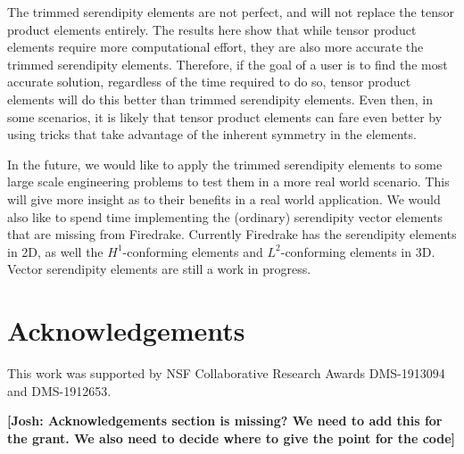 \documentclass[format=acmsmall,screen,timestamp=false,a4paper]{acmart}
\newcommand\josh[1]{\textbf{\textcolor[rgb]{0,.5,1}{[Josh: #1]}}}
\begin{document}
The trimmed serendipity elements are not perfect, and will not replace the tensor product elements entirely.  The results here show that while tensor product elements require more computational effort, they are also more accurate the trimmed serendipity elements.  Therefore, if the goal of a user is to find the most accurate solution, regardless of the time required to do so, tensor product elements will do this better than trimmed serendipity elements.  Even then, in some scenarios, it is likely that tensor product elements can fare even better by using tricks that take advantage of the inherent symmetry in the elements.  

In the future, we would like to apply the trimmed serendipity elements to some large scale engineering problems to test them in a more real world scenario.  This will give more insight as to their benefits in a real world application.  We would also like to spend time implementing the (ordinary) serendipity vector elements that are  missing from Firedrake.  Currently Firedrake has the serendipity elements in 2D, as well the $H^1$-conforming elements and $L^2$-conforming elements in 3D.  Vector serendipity elements are still a work in progress.




\section{Acknowledgements}

This work was supported by NSF Collaborative Research Awards DMS-1913094 and DMS-1912653.
    
\josh{Acknowledgements section is missing?  We need to add this for the grant.  We also need to decide where to give the point for the code}

    

\end{document}

